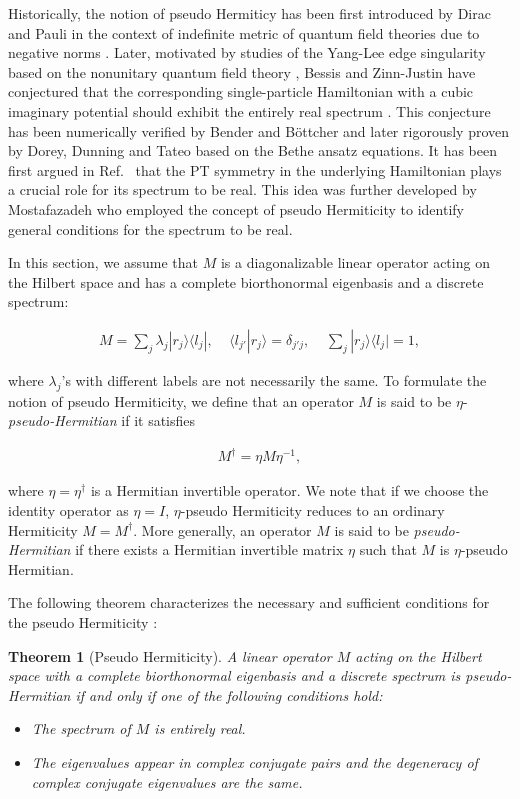 \documentclass{tADP2e}
\theoremstyle{plain}
\newcommand{\eqn}[1]{
\begin{eqnarray}
	#1
\end{eqnarray}
}
\theoremstyle{plain}
\newtheorem{theorem}{Theorem}[section]
\theoremstyle{definition}
\begin{document}
Historically, the notion of pseudo Hermiticy has been first introduced by Dirac and Pauli in the context of indefinite metric of quantum field theories due to negative norms \cite{PW43}. Later, motivated by studies of the Yang-Lee edge singularity based on the nonunitary quantum field theory \cite{MEF78,JC85}, Bessis and Zinn-Justin have conjectured that the corresponding single-particle Hamiltonian with a cubic imaginary potential should exhibit the entirely real spectrum \cite{PD07}. This conjecture has been numerically verified by Bender and B{\"o}ttcher \cite{BCM98} and later rigorously proven by Dorey, Dunning and Tateo \cite{PD01} based on the Bethe ansatz equations.  It has been first argued in Ref.~\cite{BCM98} that the PT symmetry in the underlying Hamiltonian plays a crucial role for its spectrum to be real. This idea was further developed by Mostafazadeh \cite{AM02,AM022} who employed the concept of pseudo Hermiticity to identify general conditions for the spectrum to be real. 

In this section, we assume that $M$ is a diagonalizable linear operator acting on the Hilbert space and has a complete biorthonormal eigenbasis and a discrete spectrum:
\eqn{
M=\sum_{j}\lambda_{j}|r_j\rangle\langle l_j|,\;\;\;\;\langle l_{j'}|r_j\rangle=\delta_{j'j},\;\;\;\;\sum_{j}|r_j\rangle\langle l_j|=1,
}  
where $\lambda_j$'s with different labels are not necessarily the same. 
To formulate the notion of pseudo Hermiticity, we define that an operator $M$ is said to be $\eta$-{\it pseudo-Hermitian} if it satisfies 
\eqn{\label{etapseudo}
M^\dagger=\eta M \eta^{-1},
}
where $\eta=\eta^\dagger$ is a Hermitian invertible operator. We note that if we choose the identity operator as $\eta=I$, $\eta$-pseudo Hermiticity reduces to an ordinary Hermiticity $M=M^\dagger$. More generally, an operator $M$ is said to be {\it pseudo-Hermitian} if there exists a Hermitian invertible matrix $\eta$ such that $M$ is $\eta$-pseudo Hermitian.  

The following theorem characterizes the necessary and sufficient conditions for the pseudo Hermiticity \cite{AM02}:
\begin{theorem}[Pseudo Hermiticity]
\label{pseudoh} 
A linear operator $M$ acting on the Hilbert space with a complete biorthonormal eigenbasis and a discrete spectrum is pseudo-Hermitian if and only if one of the following conditions hold:
\begin{itemize}
\item The spectrum of $M$ is entirely real.
\item The eigenvalues appear in complex conjugate pairs and the degeneracy of complex conjugate eigenvalues are the same.
\end{itemize}  
\end{theorem}
\end{document}
